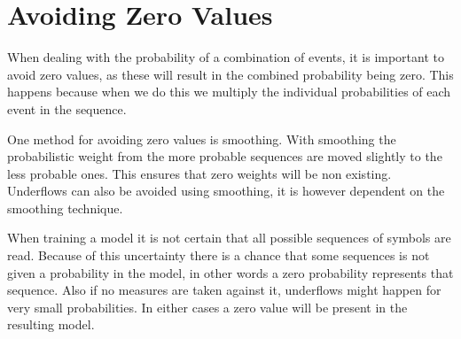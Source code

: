 \section{Avoiding Zero Values}

When dealing with the probability of a combination of events, it is important
to avoid zero values, as these will result in the combined probability being zero.
This happens because when we do this we multiply the individual probabilities of 
each event in the sequence.

One method for avoiding zero values is smoothing. 
With smoothing the probabilistic weight from the more probable sequences are moved slightly 
to the less probable ones. 
This ensures that zero weights will be non existing. 
Underflows can also be avoided using smoothing, it is however dependent on the smoothing technique.

When training a model it is not certain that all possible sequences of symbols are read. 
Because of this uncertainty there is a chance that some sequences is not given a probability in the model, in other words a zero probability represents that sequence. 
Also if no measures are taken against it, underflows might happen for very small probabilities. In either cases a zero value will be present in the resulting model. 

%

%
%

